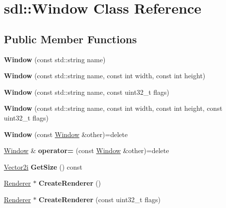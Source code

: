 \hypertarget{classsdl_1_1Window}{\section{sdl\-:\-:Window Class Reference}
\label{classsdl_1_1Window}
}
\subsection*{Public Member Functions}
\begin{DoxyCompactItemize}
\item 
\hypertarget{classsdl_1_1Window_a39a26091aa3fcd8b043816d33e57b91b}{{\bfseries Window} (const std\-::string name)}\label{classsdl_1_1Window_a39a26091aa3fcd8b043816d33e57b91b}

\item 
\hypertarget{classsdl_1_1Window_a8c1dcdc6090279451e96461d378722a4}{{\bfseries Window} (const std\-::string name, const int width, const int height)}\label{classsdl_1_1Window_a8c1dcdc6090279451e96461d378722a4}

\item 
\hypertarget{classsdl_1_1Window_a3368086b9e159382ebf5b1e23c905a06}{{\bfseries Window} (const std\-::string name, const uint32\-\_\-t flags)}\label{classsdl_1_1Window_a3368086b9e159382ebf5b1e23c905a06}

\item 
\hypertarget{classsdl_1_1Window_a0616c9466b4ad05efcf0a5e75cb07dc9}{{\bfseries Window} (const std\-::string name, const int width, const int height, const uint32\-\_\-t flags)}\label{classsdl_1_1Window_a0616c9466b4ad05efcf0a5e75cb07dc9}

\item 
\hypertarget{classsdl_1_1Window_a6c273a2d452fea90330fedd393eb9acb}{{\bfseries Window} (const \hyperlink{classsdl_1_1Window}{Window} \&other)=delete}\label{classsdl_1_1Window_a6c273a2d452fea90330fedd393eb9acb}

\item 
\hypertarget{classsdl_1_1Window_a871d1aa1cf1ed08cc01bb9e9c480d31a}{\hyperlink{classsdl_1_1Window}{Window} \& {\bfseries operator=} (const \hyperlink{classsdl_1_1Window}{Window} \&other)=delete}\label{classsdl_1_1Window_a871d1aa1cf1ed08cc01bb9e9c480d31a}

\item 
\hypertarget{classsdl_1_1Window_a1adff8ace96199ca503710ed191fc803}{\hyperlink{classsdl_1_1Vector2}{Vector2i} {\bfseries Get\-Size} () const }\label{classsdl_1_1Window_a1adff8ace96199ca503710ed191fc803}

\item 
\hypertarget{classsdl_1_1Window_a13592c51d1a4986454d04c68c155f3a2}{\hyperlink{classsdl_1_1Renderer}{Renderer} $\ast$ {\bfseries Create\-Renderer} ()}\label{classsdl_1_1Window_a13592c51d1a4986454d04c68c155f3a2}

\item 
\hypertarget{classsdl_1_1Window_a2cea0d565cea2658bdf53b7ee561f68a}{\hyperlink{classsdl_1_1Renderer}{Renderer} $\ast$ {\bfseries Create\-Renderer} (const uint32\-\_\-t flags)}\label{classsdl_1_1Window_a2cea0d565cea2658bdf53b7ee561f68a}

\end{DoxyCompactItemize}


